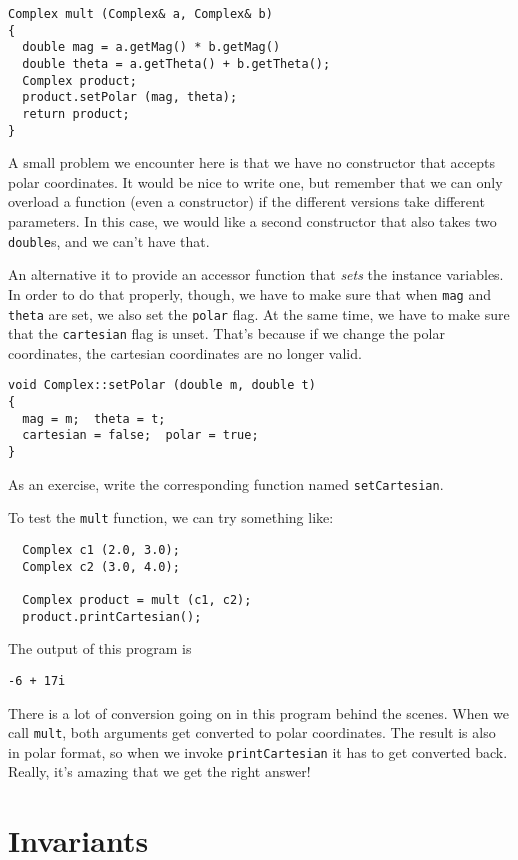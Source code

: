 \begin{verbatim}
Complex mult (Complex& a, Complex& b)
{
  double mag = a.getMag() * b.getMag()
  double theta = a.getTheta() + b.getTheta();
  Complex product;
  product.setPolar (mag, theta);
  return product;
}
\end{verbatim}
%
A small problem we encounter here is that we have no constructor
that accepts polar coordinates.  It would be nice to write one,
but remember that we can only overload a function (even a
constructor) if the different versions take different parameters.
In this case, we would like a second constructor that also takes
two {\tt double}s, and we can't have that.

An alternative it to provide an accessor function that {\em sets}
the instance variables.  In order to do that properly, though,
we have to make sure that when {\tt mag} and {\tt theta} are set,
we also set the {\tt polar} flag.  At the same time, we have to
make sure that the {\tt cartesian} flag is unset.  That's because
if we change the polar coordinates, the cartesian coordinates are
no longer valid.

\begin{verbatim}
void Complex::setPolar (double m, double t)
{
  mag = m;  theta = t;
  cartesian = false;  polar = true;
}
\end{verbatim}
%
As an exercise, write the corresponding function named
{\tt setCartesian}.

To test the {\tt mult} function, we can try something like:

\begin{verbatim}
  Complex c1 (2.0, 3.0);
  Complex c2 (3.0, 4.0);

  Complex product = mult (c1, c2);
  product.printCartesian();
\end{verbatim}
%
The output of this program is

\begin{verbatim}
-6 + 17i
\end{verbatim}
%
There is a lot of conversion going on in this program behind the
scenes.  When we call {\tt mult}, both arguments get converted to
polar coordinates.  The result is also in polar format, so when we
invoke {\tt printCartesian} it has to get converted back.  Really,
it's amazing that we get the right answer!


\section{Invariants}


